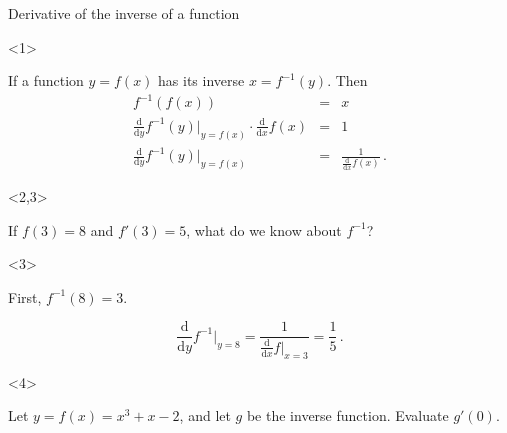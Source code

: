 \begin{frame}{Derivative of the inverse of a function}

\begin{onlyenv}<1>


If a function $y=f\left(x\right)$ has its inverse $x=f^{-1}\left(y\right)$.
Then
\begin{eqnarray*}
f^{-1}\left(f\left(x\right)\right) & = & x\\
\frac{\mathrm{d}}{\mathrm{d}y}f^{-1}\left(y\right)\bigg|_{y=f\left(x\right)}\cdot\frac{\mathrm{d}}{\mathrm{d}x}f\left(x\right) & = & 1\\
\frac{\mathrm{d}}{\mathrm{d}y}f^{-1}\left(y\right)\bigg|_{y=f\left(x\right)} & = & \frac{1}{\frac{\mathrm{d}}{\mathrm{d}x}f\left(x\right)}\,.
\end{eqnarray*}


\end{onlyenv}



\begin{onlyenv}<2,3>

\begin{example}
If $f\left(3\right)=8$ and $f'\left(3\right)=5$, what do we know
about $f^{-1}$?\end{example}

\begin{uncoverenv}<3>

\begin{sol}
First, $f^{-1}\left(8\right)=3$.

\[
\frac{\mathrm{d}}{\mathrm{d}y}f^{-1}\bigg|_{y=8}=\frac{1}{\frac{\mathrm{d}}{\mathrm{d}x}f\bigg|_{x=3}}=\frac{1}{5}\,.
\]

\end{sol}
\end{uncoverenv}

\end{onlyenv}



\begin{onlyenv}<4>

\begin{example}
Let $y=f\left(x\right)=x^{3}+x-2$, and let $g$ be the inverse function.
Evaluate $g'\left(0\right)$.
\end{example}

\end{onlyenv}

\end{frame}

